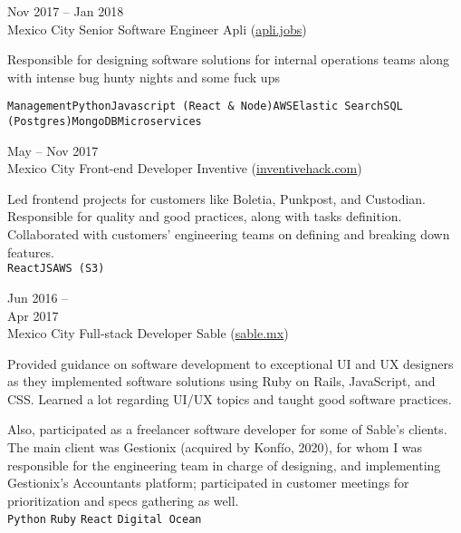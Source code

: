 \documentclass[9pt]{developercv} %
\begin{document}
\begin{entrylist}
    \entry
        {
            Nov 2017 -- Jan 2018
            \\\footnotesize{Mexico City}
        }
        {Senior Software Engineer}
        {Apli ({\href{https://apli.jobs/}{\underline{apli.jobs}}})}
        {
            Responsible for designing software solutions for internal operations teams along with intense bug hunty nights and some fuck ups

            \texttt{Management}\slashsep\texttt{Python}\slashsep\texttt{Javascript (React \& Node)}\slashsep\texttt{AWS}\slashsep\texttt{Elastic Search}\slashsep\texttt{SQL (Postgres)}\slashsep\texttt{MongoDB}\slashsep\texttt{Microservices}
        }

    \entry
        {
            May -- Nov 2017
            \\\footnotesize{Mexico City}
        }
        {Front-end Developer}
        {Inventive ({\href{https://www.linkedin.com/company/inventivehack/}{\underline{inventivehack.com}}})}
        {
            Led frontend projects for customers like Boletia, Punkpost, and Custodian. Responsible for quality and good practices, along with tasks definition. Collaborated with customers' engineering teams on defining and breaking down features.\\
            
            \texttt{ReactJS}\slashsep\texttt{AWS (S3)}

        }

    \entry
        {
            Jun 2016 -- \\Apr 2017
            \\\footnotesize{Mexico City}
        }
        {Full-stack Developer}
        {Sable ({\href{https://sable.mx/}{\underline{sable.mx}}})}
        {
            Provided guidance on software development to exceptional UI and UX designers as they implemented software solutions using Ruby on Rails, JavaScript, and CSS. Learned a lot regarding UI/UX topics and taught good software practices. 

            Also, participated as a freelancer software developer for some of Sable's clients. The main client was Gestionix (acquired by Konfío, 2020), for whom I was responsible for the engineering team in charge of designing, and implementing Gestionix's Accountants platform; participated in customer meetings for prioritization and specs gathering as well.\\
            \texttt{Python}
            \slashsep\texttt{Ruby}
            \slashsep\texttt{React}
            \slashsep\texttt{Digital Ocean}
        }


\end{entrylist}
\end{document}

